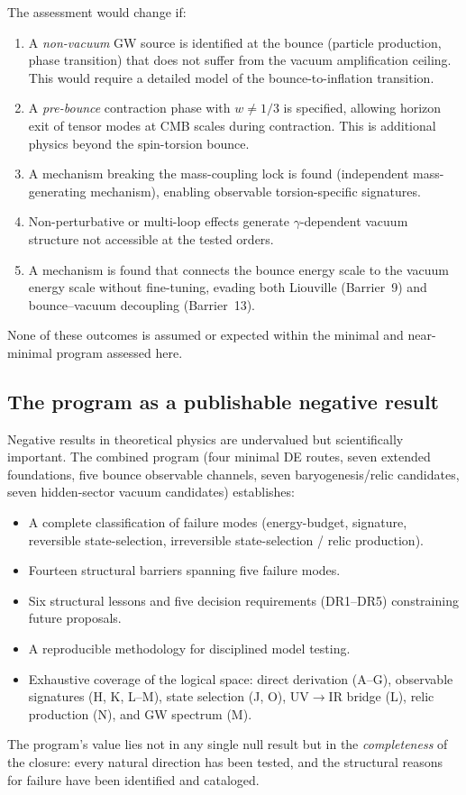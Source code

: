 \documentclass[aps,prd,twocolumn,superscriptaddress,showpacs,preprintnumbers,
  nofootinbib,longbibliography,floatfix]{revtex4-2}
\newcommand{\BI}{\gamma}
\begin{document}
The assessment would change if:
\begin{enumerate}[leftmargin=*]
  \item A \textit{non-vacuum} GW source is identified at the bounce
    (particle production, phase transition) that does not suffer from
    the vacuum amplification ceiling. This would require a detailed model
    of the bounce-to-inflation transition.
  \item A \textit{pre-bounce} contraction phase with $w \neq 1/3$ is
    specified, allowing horizon exit of tensor modes at CMB scales during
    contraction. This is additional physics beyond the spin-torsion bounce.
  \item A mechanism breaking the mass-coupling lock is found (independent
    mass-generating mechanism), enabling observable torsion-specific
    signatures.
  \item Non-perturbative or multi-loop effects generate $\BI$-dependent
    vacuum structure not accessible at the tested orders.
  \item A mechanism is found that connects the bounce energy scale to the
    vacuum energy scale without fine-tuning, evading both Liouville
    (Barrier~9) and bounce--vacuum decoupling (Barrier~13).
\end{enumerate}
None of these outcomes is assumed or expected within the minimal and
near-minimal program assessed here.

\subsection{The program as a publishable negative result}

Negative results in theoretical physics are undervalued but scientifically
important. The combined program (four minimal DE routes, seven extended
foundations, five bounce observable channels, seven baryogenesis/relic
candidates, seven hidden-sector vacuum candidates) establishes:
\begin{itemize}[leftmargin=*]
  \item A complete classification of failure modes (energy-budget,
    signature, reversible state-selection, irreversible state-selection /
    relic production).
  \item Fourteen structural barriers spanning five failure modes.
  \item Six structural lessons and five decision requirements (DR1--DR5)
    constraining future proposals.
  \item A reproducible methodology for disciplined model testing.
  \item Exhaustive coverage of the logical space: direct derivation
    (A--G), observable signatures (H, K, L--M), state selection (J, O),
    UV$\to$IR bridge (L), relic production (N), and GW spectrum (M).
\end{itemize}
The program's value lies not in any single null result but in the
\textit{completeness} of the closure: every natural direction has been
tested, and the structural reasons for failure have been identified and
cataloged.
\end{document}
